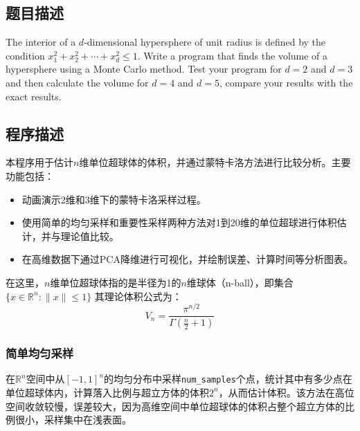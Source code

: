 \subsection{题目描述}
\noindent
The interior of a $d$-dimensional hypersphere of unit radius is defined by the condition
$x_1^2 + x_2^2 + \cdots + x_d^2 \leq 1$. Write a program that finds the volume of a hypersphere
using a Monte Carlo method. Test your program for $d=2$ and $d=3$ and then calculate the volume
for $d=4$ and $d=5$, compare your results with the exact results.


\subsection{程序描述}
本程序用于估计$n$维单位超球体的体积，并通过蒙特卡洛方法进行比较分析。主要功能包括：
\begin{itemize}
    \item 动画演示2维和3维下的蒙特卡洛采样过程。
    \item 使用简单的均匀采样和重要性采样两种方法对1到20维的单位超球进行体积估计，并与理论值比较。
    \item 在高维数据下通过PCA降维进行可视化，并绘制误差、计算时间等分析图表。
\end{itemize}
在这里，$n$维单位超球体指的是半径为1的$n$维球体（n-ball），即集合
\(
\{x \in \mathbb{R}^n : \|x\| \le 1\}
\)
其理论体积公式为：
\[
    V_n = \frac{\pi^{n/2}}{\Gamma\left(\frac{n}{2} + 1\right)}
\]
\subsubsection{简单均匀采样}
在$\mathbb{R}^n$空间中从$[-1, 1]^n$的均匀分布中采样\texttt{num\_samples}个点，统计其中有多少点在单位超球体内，计算落入比例与超立方体的体积$2^n$，从而估计体积。该方法在高位空间收敛较慢，误差较大，因为高维空间中单位超球体的体积占整个超立方体的比例很小，采样集中在浅表面。

